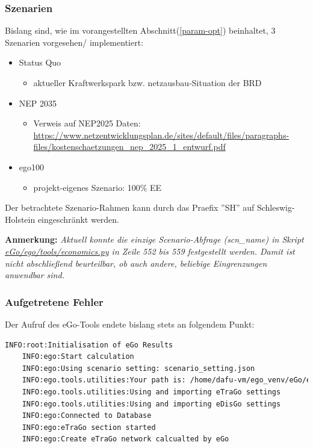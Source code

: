 \documentclass[
a4paper,     %
12pt         %
]{scrartcl}  %
\begin{document}
\subsubsection{Szenarien}
Bislang sind, wie im vorangestellten  Abschnitt(\ref{param-opt}) beinhaltet, 3 Szenarien vorgesehen/ implementiert:
\begin{itemize}
	\item Status Quo
	\begin{itemize}
		\item aktueller Kraftwerkspark bzw. netzausbau-Situation der BRD
	\end{itemize}
	\item NEP 2035
	\begin{itemize}
		\item[] Verweis auf NEP2025 Daten:
		\\\url{https://www.netzentwicklungsplan.de/sites/default/files/paragraphs-files/kostenschaetzungen_nep_2025_1_entwurf.pdf}
	\end{itemize}
	\item ego100
	\begin{itemize}
		\item projekt-eigenes Szenario: 100\% EE
	\end{itemize}
\end{itemize}
Der betrachtete Szenario-Rahmen kann durch das Praefix ''SH'' auf Schleswig-Holstein  eingeschränkt werden.

\textbf{Anmerkung:} \textit{Aktuell konnte die einzige Scenario-Abfrage (scn\_name) in Skript\\ \url{eGo/ego/tools/economics.py} in Zeile 552 bis 559 festgestellt werden. Damit ist nicht abschließend beurteilbar, ob auch andere, beliebige Eingrenzungen anwendbar sind.}\\



\subsubsection{Aufgetretene Fehler}
Der Aufruf des eGo-Tools endete bislang stets an folgendem Punkt:
\begin{lstlisting}[language=bash]
	INFO:root:Initialisation of eGo Results
	INFO:ego:Start calculation
	INFO:ego:Using scenario setting: scenario_setting.json
	INFO:ego.tools.utilities:Your path is: /home/dafu-vm/ego_venv/eGo/ego
	INFO:ego.tools.utilities:Using and importing eTraGo settings
	INFO:ego.tools.utilities:Using and importing eDisGo settings
	INFO:ego:Connected to Database
	INFO:ego:eTraGo section started
	INFO:ego:Create eTraGo network calcualted by eGo
\end{lstlisting}
\end{document}
